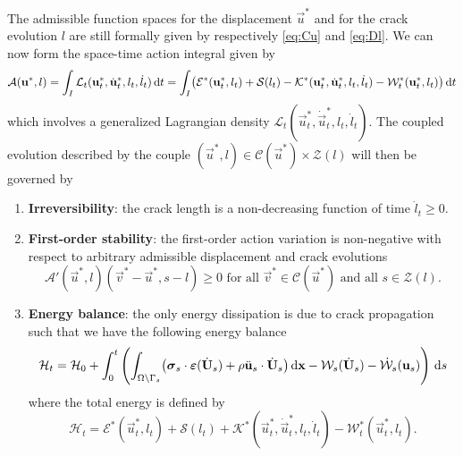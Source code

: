 The admissible function spaces for the displacement $\vec{u}^*$ and for the crack evolution $l$ are still formally given by respectively \eqref{eq:Cu} and \eqref{eq:Dl}. We can now form the space-time action integral given by
\begin{equation} \label{eq:action}
\mathcal{A}(\vec{u}^*,l)=\int_I\mathcal{L}_t(\vec{u}^*_t,\dot{\vec{u}}^*_t,l_t,\dot{l}_t)\D{t}=\int_I\bigl(\mathcal{E}^*(\vec{u}_t^*,l_t)+\mathcal{S}(l_t)-\mathcal{K}^*(\vec{u}_t^*,\dot{\vec{u}}_t^*,l_t,\dot{l}_t)-\mathcal{W}_t^*(\vec{u}_t^*,l_t)\bigr)\D{t}
\end{equation}
which involves a generalized Lagrangian density $\mathcal{L}_t(\vec{u}^*_t,\dot{\vec{u}}^*_t,l_t,\dot{l}_t)$. The coupled evolution described by the couple $(\vec{u}^*,l)\in\mathcal{C}(\vec{u}^*)\times\mathcal{Z}(l)$ will then be governed by
\begin{definition} \label{def:griffith} \noindent
\begin{enumerate}
\item \textbf{Irreversibility}: the crack length is a non-decreasing function of time $\dot{l}_t\geq 0$.
\item \textbf{First-order stability}: the first-order action variation is non-negative with respect to arbitrary admissible displacement and crack evolutions
\begin{equation} \label{eq:stability}
\mathcal{A}'(\vec{u}^*,l)(\vec{v}^*-\vec{u}^*,s-l)\geq 0\text{ for all $\vec{v}^*\in\mathcal{C}(\vec{u}^*)$ and all $s\in\mathcal{Z}(l)$}.
\end{equation}
\item \textbf{Energy balance}: the only energy dissipation is due to crack propagation such that we have the following energy balance
\begin{equation} \label{eq:eb}
\mathcal{H}_t=\mathcal{H}_0+\int_0^t\left(\int_{\Omega\setminus\Gamma_s}\bigl(\sig_s\cdot\eps(\dot{\vec{U}}_s)+\rho\ddot{\vec{u}}_s\cdot\dot{\vec{U}}_s\bigr)\dx-\mathcal{W}_s(\dot{\vec{U}}_s)-\dot{\mathcal{W}}_s(\vec{u}_s)\right)\D{s}
\end{equation}
where the total energy is defined by
\begin{equation}
\mathcal{H}_t=\mathcal{E}^*(\vec{u}_t^*,l_t)+\mathcal{S}(l_t)+\mathcal{K}^*(\vec{u}_t^*,\dot{\vec{u}}_t^*,l_t,\dot{l}_t)-\mathcal{W}^*_t(\vec{u}_t^*,l_t).
\end{equation}
\end{enumerate}
\end{definition}

